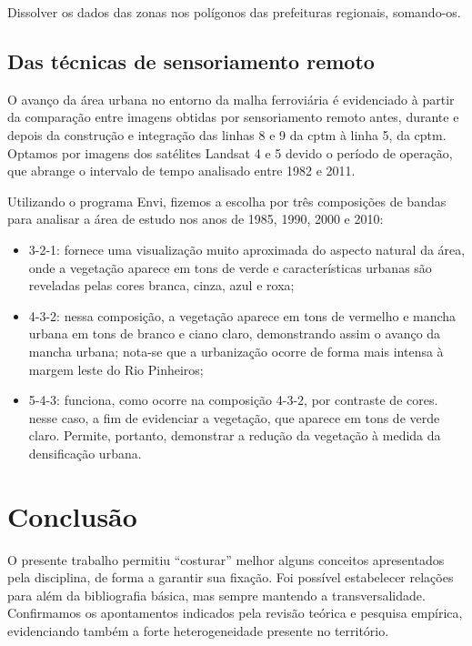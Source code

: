 	Dissolver os dados das zonas nos polígonos das prefeituras regionais, somando-os.
	
	\section{Das técnicas de sensoriamento remoto}
	
	O avanço da área urbana no entorno da malha ferroviária é evidenciado à partir da comparação entre imagens obtidas por sensoriamento remoto antes, durante e depois da construção e integração das linhas 8 e 9 da \gls{cptm} à linha 5, da \gls{cptm}. Optamos por imagens dos satélites Landsat 4 e 5 devido o período de operação, que abrange o intervalo de tempo analisado \textemdash entre 1982 e 2011.
	
	Utilizando o programa Envi, fizemos a escolha por três composições de bandas para analisar a área de estudo nos anos de 1985, 1990, 2000 e 2010:
	
	\begin{itemize}
		\item 3-2-1: fornece uma visualização muito aproximada do aspecto natural da área, onde a vegetação aparece em tons de verde e características urbanas são reveladas pelas cores branca, cinza, azul e roxa;
		\item 4-3-2: nessa composição, a vegetação aparece em tons de vermelho e mancha urbana em tons de branco e ciano claro, demonstrando assim o avanço da mancha urbana; nota-se que a urbanização ocorre de forma mais intensa à margem leste do Rio Pinheiros;
		\item 5-4-3: funciona, como ocorre na composição 4-3-2, por contraste de cores. nesse caso, a fim de evidenciar a vegetação, que aparece em tons de verde claro. Permite, portanto, demonstrar a redução da vegetação à medida da densificação urbana.
	\end{itemize}

%
%

	\chapter{Conclusão}
	
	O presente trabalho permitiu ``costurar'' melhor alguns conceitos apresentados pela disciplina, de forma a garantir sua fixação. Foi possível estabelecer relações para além da bibliografia básica, mas sempre mantendo a transversalidade. Confirmamos os apontamentos indicados pela revisão teórica e pesquisa empírica, evidenciando também a forte heterogeneidade presente no território.
	
